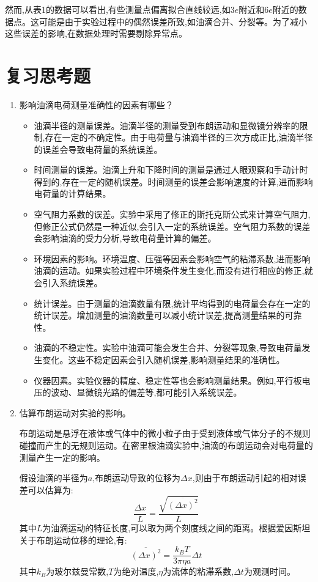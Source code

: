 \documentclass[UTF8]{ctexart}
\begin{document}
然而,从表1的数据可以看出,有些测量点偏离拟合直线较远,如$3e$附近和$6e$附近的数据点。这可能是由于实验过程中的偶然误差所致,如油滴合并、分裂等。为了减小这些误差的影响,在数据处理时需要剔除异常点。

\newpage
\section{复习思考题}

\begin{enumerate}
  \item 影响油滴电荷测量准确性的因素有哪些？
  \begin{itemize}
    \item 油滴半径的测量误差。油滴半径的测量受到布朗运动和显微镜分辨率的限制,存在一定的不确定性。由于电荷量与油滴半径的三次方成正比,油滴半径的误差会导致电荷量的系统误差。
    \item 时间测量的误差。油滴上升和下降时间的测量是通过人眼观察和手动计时得到的,存在一定的随机误差。时间测量的误差会影响速度的计算,进而影响电荷量的计算结果。
    \item 空气阻力系数的误差。实验中采用了修正的斯托克斯公式来计算空气阻力,但修正公式仍然是一种近似,会引入一定的系统误差。空气阻力系数的误差会影响油滴的受力分析,导致电荷量计算的偏差。
    \item 环境因素的影响。环境温度、压强等因素会影响空气的粘滞系数,进而影响油滴的运动。如果实验过程中环境条件发生变化,而没有进行相应的修正,就会引入系统误差。
    \item 统计误差。由于测量的油滴数量有限,统计平均得到的电荷量会存在一定的统计误差。增加测量的油滴数量可以减小统计误差,提高测量结果的可靠性。
    \item 油滴的不稳定性。实验中油滴可能会发生合并、分裂等现象,导致电荷量发生变化。这些不稳定因素会引入随机误差,影响测量结果的准确性。
    \item 仪器因素。实验仪器的精度、稳定性等也会影响测量结果。例如,平行板电压的波动、显微镜光路的偏差等,都可能引入系统误差。
  \end{itemize}
    \item 估算布朗运动对实验的影响。
    
    布朗运动是悬浮在液体或气体中的微小粒子由于受到液体或气体分子的不规则碰撞而产生的无规则运动。在密里根油滴实验中,油滴的布朗运动会对电荷量的测量产生一定的影响。
    
    假设油滴的半径为$a$,布朗运动导致的位移为$\Delta x$,则由于布朗运动引起的相对误差可以估算为:
    \begin{equation}
      \frac{\Delta x}{L} = \frac{\sqrt{\overline{(\Delta x)^2}}}{L}
    \end{equation}
    其中$L$为油滴运动的特征长度,可以取为两个刻度线之间的距离。根据爱因斯坦关于布朗运动位移的理论,有:
    \begin{equation}
      \overline{(\Delta x)^2} = \frac{k_B T}{3\pi \eta a} \Delta t
    \end{equation}
    其中$k_B$为玻尔兹曼常数,$T$为绝对温度,$\eta$为流体的粘滞系数,$\Delta t$为观测时间。
    

\end{enumerate}
\end{document}
